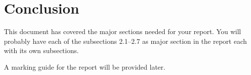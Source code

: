 \section{Conclusion}
\label{sec:conclusion}

This document has covered the major sections needed for your
report. You will probably have each of the subsections 2.1--2.7 as
major section in the report each with its own subsections. 

A marking guide for the report will be provided later.
